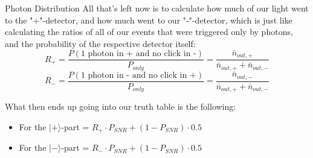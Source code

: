 \documentclass[aspectratio=169]{beamer}
\begin{document}
\begin{frame}{Photon Distribution}
    All that's left now is to calculate how much of our light went to the "+"-detector, and how much went to our "-"-detector, which is just like calculating the ratios of all of our events that were triggered only by photons, and the probability of the respective detector itself:
    $$
    R_{+} = \frac{P(\text{1 photon in + and no click in -})}{P_{only}} = \frac{\bar{n}_{out,+}}{\bar{n}_{out,+} + \bar{n}_{out,-}}
    $$
    $$
    R_{-} = \frac{P(\text{1 photon in - and no click in +})}{P_{only}} = \frac{\bar{n}_{out,-}}{\bar{n}_{out,+} + \bar{n}_{out,-}}
    $$

    What then ends up going into our truth table is the following:
    \begin{itemize}
        \item For the $|+\rangle$-part = $R_{+}\cdot P_{SNR} + (1-P_{SNR})\cdot 0.5$
        \item For the $|-\rangle$-part = $R_{-}\cdot P_{SNR} + (1-P_{SNR})\cdot 0.5$
    \end{itemize}
\end{frame}
\end{document}
